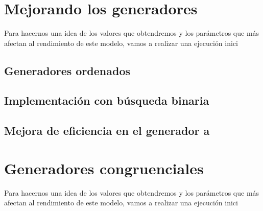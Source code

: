\documentclass[11pt,a4paper]{report}
\begin{document}
\section{Mejorando los generadores}

Para hacernos una idea de los valores que obtendremos y los parámetros que más afectan al rendimiento de este modelo,
vamos a realizar una ejecución inici

\subsection{Generadores ordenados}

\subsection{Implementación con búsqueda binaria}

\subsection{Mejora de eficiencia en el generador a}


\section{Generadores congruenciales}

Para hacernos una idea de los valores que obtendremos y los parámetros que más afectan al rendimiento de este modelo,
vamos a realizar una ejecución inici
\end{document}
